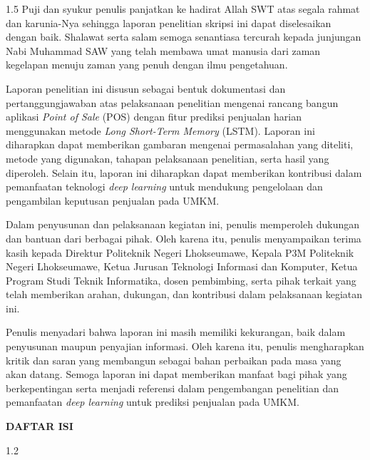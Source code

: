 \documentclass[12pt, a4paper, onecolumn, oneside]{report}
\begin{document}
\begin{spacing}{1.5}
Puji dan syukur penulis panjatkan ke hadirat Allah SWT atas segala rahmat dan karunia-Nya sehingga laporan penelitian skripsi ini dapat diselesaikan dengan baik. Shalawat serta salam semoga senantiasa tercurah kepada junjungan Nabi Muhammad SAW yang telah membawa umat manusia dari zaman kegelapan menuju zaman yang penuh dengan ilmu pengetahuan.

Laporan penelitian ini disusun sebagai bentuk dokumentasi dan pertanggungjawaban atas pelaksanaan penelitian mengenai rancang bangun aplikasi \textit{Point of Sale} (POS) dengan fitur prediksi penjualan harian menggunakan metode \textit{Long Short-Term Memory} (LSTM). Laporan ini diharapkan dapat memberikan gambaran mengenai permasalahan yang diteliti, metode yang digunakan, tahapan pelaksanaan penelitian, serta hasil yang diperoleh. Selain itu, laporan ini diharapkan dapat memberikan kontribusi dalam pemanfaatan teknologi \textit{deep learning} untuk mendukung pengelolaan dan pengambilan keputusan penjualan pada UMKM.

Dalam penyusunan dan pelaksanaan kegiatan ini, penulis memperoleh dukungan dan bantuan dari berbagai pihak. Oleh karena itu, penulis menyampaikan terima kasih kepada Direktur Politeknik Negeri Lhokseumawe, Kepala P3M Politeknik Negeri Lhokseumawe, Ketua Jurusan Teknologi Informasi dan Komputer, Ketua Program Studi Teknik Informatika, dosen pembimbing, serta pihak terkait yang telah memberikan arahan, dukungan, dan kontribusi dalam pelaksanaan kegiatan ini.

Penulis menyadari bahwa laporan ini masih memiliki kekurangan, baik dalam penyusunan maupun penyajian informasi. Oleh karena itu, penulis mengharapkan kritik dan saran yang membangun sebagai bahan perbaikan pada masa yang akan datang. Semoga laporan ini dapat memberikan manfaat bagi pihak yang berkepentingan serta menjadi referensi dalam pengembangan penelitian dan pemanfaatan \textit{deep learning} untuk prediksi penjualan pada UMKM.
\end{spacing}

\newpage

\renewcommand{\contentsname}{}
\renewcommand{\listfigurename}{}
\renewcommand{\listtablename}{}

{}
\vspace*{-1cm}
{\centering\fontsize{14pt}{16pt}\selectfont\bfseries DAFTAR ISI\par}
\vspace{20pt}
\begin{spacing}{1.2}
\makeatletter{}\makeatother
\end{spacing}
\end{document}
